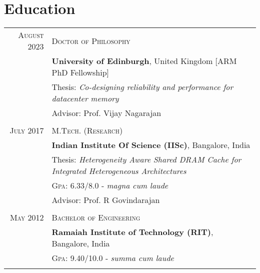\documentclass[a4paper,10pt]{article} %
\begin{document}
\vspace{0.05in}



\section{Education}

\begin{tabular}{rl}
\textsc{August 2023}  & \textsc{Doctor of Philosophy} \\
& \textbf{University of Edinburgh}, United Kingdom \qquad \small{[ARM PhD Fellowship]} \\
& Thesis: \small\emph{Co-designing reliability and performance for datacenter memory} \\
& Advisor: Prof. Vijay Nagarajan \\
&\\



\textsc{July} 2017 & \textsc{M.Tech. (Research)} \\
& \textbf{Indian Institute Of Science (IISc)}, Bangalore, India\\
& Thesis: \small\emph{Heterogeneity Aware Shared DRAM Cache for Integrated Heterogeneous Architectures} \\
&\normalsize \textsc{Gpa}: 6.33/8.0 - \small\emph{magna cum laude}\\
& Advisor: Prof. R Govindarajan \\
&\\


\textsc{May} 2012 & \textsc{Bachelor of Engineering}\\ 
& \textbf{Ramaiah Institute of Technology (RIT)}, Bangalore, India\\
&\normalsize \textsc{Gpa}: 9.40/10.0 - \small\emph{summa cum laude}\\
&\\


\end{tabular}
\end{document}
